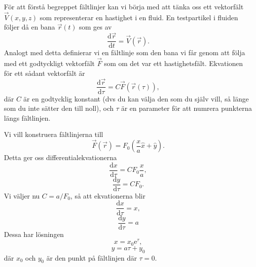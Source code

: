 \documentclass[%
oneside,                 %
final,                   %
10pt]{article}
\newenvironment{notice_mdfboxadmon}[1][]{
\begin{notice_mdfboxmdframed}[frametitle=#1]
}
{
\end{notice_mdfboxmdframed}
}
\begin{document}
För att förstå begreppet fältlinjer kan vi börja med att tänka oss ett vektorfält $\vec{V}(x,y,z)$ som representerar en hastighet i en fluid.  En testpartikel i fluiden följer då en bana $\vec{r}(t)$ som ges av
\begin{equation}
  \frac{\mbox{d}\vec{r}}{\mbox{d}t} = \vec{V}\left(\vec{r}\right).
\end{equation}
Analogt med detta definierar vi en fältlinje som den bana vi får genom att följa med ett godtyckligt vektorfält $\vec{F}$ som om det var ett hastighetsfält.  Ekvationen för ett sådant vektorfält är
\begin{equation}
  \frac{\mbox{d}\vec{r}}{\mbox{d}\tau} = C \vec{F}\left(\vec{r}(\tau)\right),
\end{equation}
där $C$ är en godtycklig konstant (dvs du kan välja den som du själv 
vill, så länge som du inte sätter den till noll), och $\tau$ är en
parameter för att numrera punkterna längs fältlinjen.


\begin{notice_mdfboxadmon}
Vi vill konstruera fältlinjerna till 
\begin{equation}
  \vec{F}\left(\vec{r}\right) = F_0\left(\frac{x}{a} \hat{x} + 
\hat{y}\right).
\end{equation}
Detta ger oss differentialekvationerna
\begin{equation}
  \frac{\mbox{d}x}{\mbox{d}\tau} = CF_0 \frac{x}{a},
\end{equation}
\begin{equation}
  \frac{\mbox{d}y}{\mbox{d}\tau} = C F_0.
\end{equation}
Vi väljer nu $C = a/F_0$, så att ekvationerna blir
\begin{equation}
  \frac{\mbox{d}x}{\mbox{d}\tau} = x,
\end{equation}
\begin{equation}
  \frac{\mbox{d}y}{\mbox{d}\tau} = a
\end{equation}
Dessa har lösningen
\begin{equation}
  x = x_0 \mbox{e}^\tau,
\end{equation}
\begin{equation}
  y = a \tau + y_0
\end{equation}
där $x_0$ och $y_0$ är den punkt på fältlinjen där $\tau = 0$.
\end{notice_mdfboxadmon} %
\end{document}
